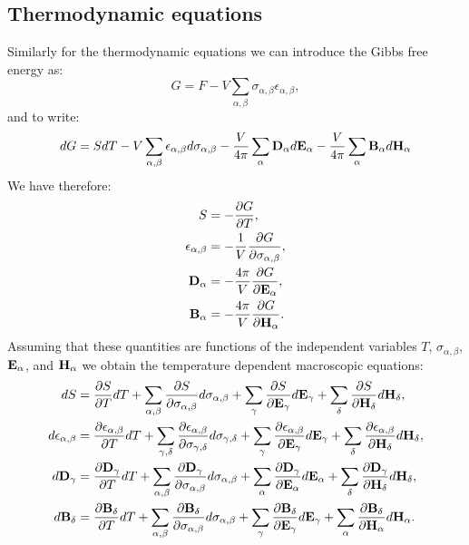 \documentclass[12pt,a4paper]{article}
\begin{document}
{\subsection{\color{orange}Thermodynamic equations}
Similarly for the thermodynamic equations we can introduce the Gibbs
free energy as:
\begin{equation}
G=F - V \sum_{\alpha,\beta} \sigma_{\alpha,\beta} \epsilon_{\alpha,\beta},
\end{equation}
and to write:
\begin{equation}
dG=SdT - V \sum_{\alpha,\beta} \epsilon_{\alpha,\beta} d \sigma_{\alpha,\beta}
-{V \over 4 \pi} \sum_{\alpha} {\bf D}_\alpha d {\bf E}_\alpha
-{V \over 4 \pi} \sum_{\alpha} {\bf B}_\alpha d {\bf H}_\alpha
\end{equation}
We have therefore:
\begin{align}
S&= -{\partial G \over \partial T}, \\
\epsilon_{\alpha,\beta}&= -{1\over V}
{\partial G \over \partial \sigma_{\alpha,\beta}}, \\
{\bf D}_{\alpha}&= -{4 \pi \over V}
{\partial G \over \partial {\bf E}_{\alpha}}, \\
{\bf B}_{\alpha}&= -{4 \pi \over V}
{\partial G \over \partial {\bf H}_{\alpha}}.
\end{align}
Assuming that these quantities are functions of the independent variables
$T$, $\sigma_{\alpha,\beta}$, ${\bf E}_\alpha$, and ${\bf H}_\alpha$ we
obtain the temperature dependent macroscopic equations:
\begin{align}
dS&= {\partial S \over \partial T} dT+\sum_{\alpha,\beta}
{\partial S \over \partial \sigma_{\alpha,\beta}}d\sigma_{\alpha,\beta}
+\sum_\gamma{\partial S \over \partial {\bf E}_{\gamma}}d{\bf E}_{\gamma}+ 
\sum_\delta{\partial S \over \partial {\bf H}_{\delta}}d{\bf H}_{\delta}, \\
d\epsilon_{\alpha,\beta}&=
{\partial \epsilon_{\alpha,\beta} \over \partial T} dT+\sum_{\gamma,\delta}
{\partial \epsilon_{\alpha,\beta} \over \partial 
\sigma_{\gamma,\delta}}d\sigma_{\gamma,\delta}
+\sum_\gamma{\partial \epsilon_{\alpha,\beta} \over \partial 
{\bf E}_{\gamma}}d{\bf E}_{\gamma}+ 
\sum_\delta{\partial \epsilon_{\alpha,\beta} \over \partial 
{\bf H}_{\delta}}d{\bf H}_{\delta}, \\
d{\bf D}_\gamma&= 
{\partial  {\bf D}_\gamma \over \partial T} dT+\sum_{\alpha,\beta}
{\partial {\bf D}_\gamma \over \partial \sigma_{\alpha,\beta}}
d\sigma_{\alpha,\beta}
+\sum_\alpha{\partial {\bf D}_\gamma \over \partial {\bf E}_{\alpha}}d{\bf E}_{\alpha}+ 
\sum_\delta{\partial {\bf D}_\gamma \over \partial {\bf H}_{\delta}}d{\bf H}_{\delta}, \\
d{\bf B}_\delta&= 
{\partial {\bf B}_\delta \over \partial T} dT+\sum_{\alpha,\beta}
{\partial {\bf B}_\delta \over \partial \sigma_{\alpha,\beta}}
d\sigma_{\alpha,\beta}
+\sum_\gamma{\partial {\bf B}_\delta \over \partial {\bf E}_{\gamma}}
d{\bf E}_{\gamma}+ 
\sum_\alpha{\partial {\bf B}_\delta \over \partial {\bf H}_{\alpha}}
d{\bf H}_{\alpha}. 
\end{align}

}
\end{document}
